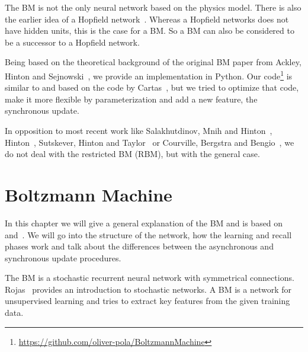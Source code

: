 \documentclass[12pt,twoside]{article}
\theoremstyle{plain}
\theoremstyle{definition}
\theoremstyle{remark}
\begin{document}
The BM is not the only neural network based on the physics model. There is also the earlier idea of a Hopfield network~\cite{Hopfield}\cite[Chapter~13]{Rojas}\cite[Chapter~43]{MacKay}. Whereas a Hopfield networks does not have hidden units, this is the case for a BM. So a BM can also be considered to be a successor to a Hopfield network.

Being based on the theoretical background of the original BM paper from Ackley, Hinton and Sejnowski~\cite{Ackley}, we provide an implementation in Python. Our code\footnote{\url{https://github.com/oliver-pola/BoltzmannMachine}} is similar to and based on the code by Cartas~\cite{BMImpl}, but we tried to optimize that code, make it more flexible by parameterization and add a new feature, the synchronous update.

In opposition to most recent work like Salakhutdinov, Mnih and Hinton~\cite{Salakhutdinov}, Hinton~\cite{Hinton}, Sutskever, Hinton and Taylor~\cite{Sutskever} or Courville, Bergstra and Bengio~\cite{Courville}, we do not deal with the restricted BM (RBM), but with the general case.


\section{Boltzmann Machine}
\label{sec:bm}

In this chapter we will give a general explanation of the BM and is based on~\cite{Ackley} and~\cite[Chapter~43]{MacKay}. We will go into the structure of the network, how the learning and recall phases work and talk about the differences between the asynchronous and synchronous update procedures.

The BM is a stochastic recurrent neural network with symmetrical connections.
Rojas~\cite[Chapter~14]{Rojas} provides an introduction to stochastic networks.
A BM is a network for unsupervised learning and tries to extract key features from the given training data.
\end{document}

